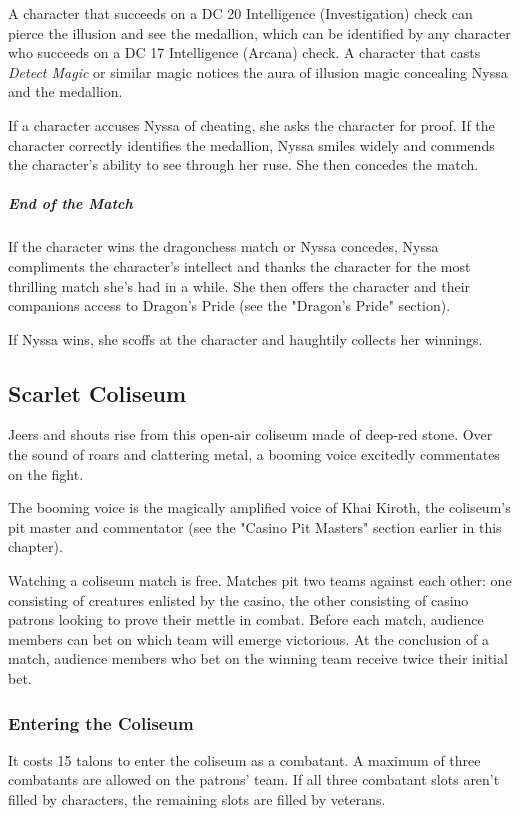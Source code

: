 \documentclass[10pt,a4paper,twoside,bg=print,twocolumn,openany,nodeprecatedcode]{dndbook}
\begin{document}
A character that succeeds on a DC 20 Intelligence (Investigation) check can pierce the illusion and see the medallion, which can be identified by any character who succeeds on a DC 17 Intelligence (Arcana) check. A character that casts \textit{Detect Magic} or similar magic notices the aura of illusion magic concealing Nyssa and the medallion.

If a character accuses Nyssa of cheating, she asks the character for proof. If the character correctly identifies the medallion, Nyssa smiles widely and commends the character's ability to see through her ruse. She then concedes the match.

\subparagraph{End of the Match}
If the character wins the dragonchess match or Nyssa concedes, Nyssa compliments the character's intellect and thanks the character for the most thrilling match she's had in a while. She then offers the character and their companions access to Dragon's Pride (see the "Dragon's Pride" section).

If Nyssa wins, she scoffs at the character and haughtily collects her winnings.

\subsection{Scarlet Coliseum}
\begin{DndReadAloud}{}
Jeers and shouts rise from this open-air coliseum made of deep-red stone. Over the sound of roars and clattering metal, a booming voice excitedly commentates on the fight.

\end{DndReadAloud}

The booming voice is the magically amplified voice of Khai Kiroth, the coliseum's pit master and commentator (see the "Casino Pit Masters" section earlier in this chapter).

Watching a coliseum match is free. Matches pit two teams against each other: one consisting of creatures enlisted by the casino, the other consisting of casino patrons looking to prove their mettle in combat. Before each match, audience members can bet on which team will emerge victorious. At the conclusion of a match, audience members who bet on the winning team receive twice their initial bet.

\subsubsection{Entering the Coliseum}
It costs 15 talons to enter the coliseum as a combatant. A maximum of three combatants are allowed on the patrons' team. If all three combatant slots aren't filled by characters, the remaining slots are filled by veterans.
\end{document}
